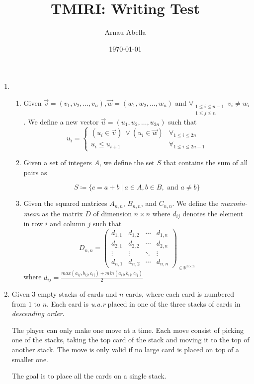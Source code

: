 \documentclass[12pt, a4paper]{article}
\title{%
  TMIRI: \Large{Writing Test}\\
}
\author{Arnau Abella}
\date{\today} %
\begin{document}
\maketitle

\begin{enumerate}
  \item
    \begin{enumerate}
      \item Given $\vec{v} = (v_{1}, v_{2}, \ldots, v_{n}), \vec{w} = (w_{1}, w_{2}, \ldots, w_{n})$ and $\forall_{\substack{1 \leq i \leq n - 1\\1 \leq j \leq n}} \ v_i \neq w_i$. We define a new vector $\vec{u} = (u_{1}, u_{2}, \ldots, u_{2n})$ such that
        \[
           u_{i} = \begin{cases}
                 (u_{i}\in \vec{v}) \ \lor (u_{i}\in \vec{w})  & \forall_{1 \leq i \leq 2n }\\
                 u_{i}\leq u_{i+1} & \forall_{1 \leq i \leq 2n-1 }
              \end{cases}
       \]

      \item Given a set of integers $A$, we define the set $S$ that contains the sum of all pairs as

        \begin{equation*}
          S \coloneqq \{c = a + b \ | \ a \in A, b \in B, \text{ and } a \neq b\}
        \end{equation*}

      \item Given the squared matrices $A_{n,n}$, $B_{n,n}$, and $C_{n,n}$. We define the \mbox{\textit{maxmin-mean}} as the matrix $D$ of dimension $n \times n$ where $d_{ij}$ denotes the element in row $i$ and column $j$ such that
        \begin{equation*}
        D_{n,n} =
        \begin{pmatrix}
        d_{1,1} & d_{1,2} & \cdots & d_{1,n} \\
        d_{2,1} & d_{2,2} & \cdots & d_{2,n} \\
        \vdots  & \vdots  & \ddots & \vdots  \\
        d_{n,1} & d_{n,2} & \cdots & d_{n,n}
        \end{pmatrix}_{\in \mathbb{R}^{n \times n}}
        \end{equation*} where $d_{ij} = \frac{max(a_{ij}, b_{ij}, c_{ij}) + min(a_{ij}, b_{ij}, c_{ij})}{2}$
  \end{enumerate}
  \newpage
  \item Given $3$ empty stacks of cards and $n$ cards, where each card is numbered from $1$ to $n$. Each card is \textit{u.a.r} placed in one of the three stacks of cards in \textit{descending order}.

    The player can only make one move at a time. Each move consist of picking one of the stacks, taking the top card of the stack and moving it to the top of another stack. The move is only valid if no large card is placed on top of a smaller one.

    The goal is to place all the cards on a single stack.
\end{enumerate}



\end{document}
